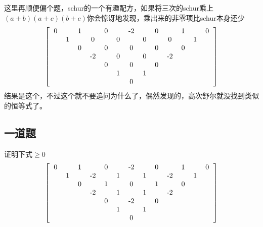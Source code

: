 \documentclass[UTF8]{ctexart}
\begin{document}
这里再顺便偏个题，schur的一个有趣配方，如果将三次的schur乘上$ (a+b)(a+c)(b+c) $你会惊讶地发现，乘出来的非零项比schur本身还少
\renewcommand*{\arraystretch}{1.732}\[\left[\begin{matrix}
	\begin{tabular}{ccccccccccccc}
		0& &1& &0& &-2& &0& &1& &0\\
		&1& &0& &0& &0& &0& &1&\\
		& &0& &0& &0& &0& &0& &\\
		& & &-2& &0& &0& &-2& & &\\
		& & & &0& &0& &0& & & &\\
		& & & & &1& &1& & & & &\\
		& & & & & &0& & & & & &\\
	\end{tabular}
\end{matrix}\right]\]
结果是这个，不过这个就不要追问为什么了，偶然发现的，高次舒尔就没找到类似的恒等式了。
\subsection{一道题}
证明下式$ \geq 0 $\\
\renewcommand*{\arraystretch}{1.732}\[\left[\begin{matrix}
	\begin{tabular}{ccccccccccccc}
		0&  &1  &  & 0 &  & -2 &  & 0 &  & 1 &  & 0\\
		&1  &  & -2 &  & 1 &  & 1 &  & -2 &  & 1 & \\
		&  & 0 &  & 1 &  &  0&  &  1&  &  0&  & \\
		&  &  &  -2 &  & 1 &  & 1 &  & -2  &  &  & \\
		&  &  &  &  0&  &-2  &  & 0 &  &  &  & \\
		&  &  &  &  &  1&  &1  &  &  &  &  & \\
		&  &  &  &  &  &  0&  &  &  &  &  & \\
	\end{tabular}
\end{matrix}\right]\]
\end{document}
